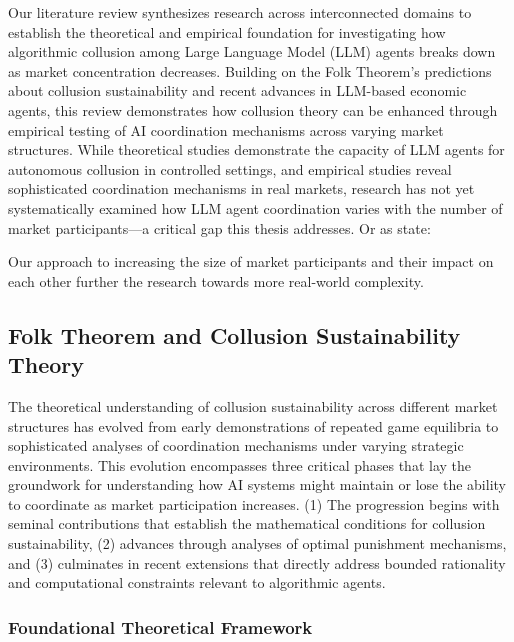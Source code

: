 Our literature review synthesizes research across interconnected domains to establish the theoretical and empirical foundation for investigating how algorithmic collusion among Large Language Model (LLM) agents breaks down as market concentration decreases. Building on the Folk Theorem's predictions about collusion sustainability and recent advances in LLM-based economic agents, this review demonstrates how collusion theory can be enhanced through empirical testing of AI coordination mechanisms across varying market structures. While theoretical studies demonstrate the capacity of LLM agents for autonomous collusion in controlled settings, and empirical studies reveal sophisticated coordination mechanisms in real markets, research has not yet systematically examined how LLM agent coordination varies with the number of market participants---a critical gap this thesis addresses. Or as \textcite[p.24]{fish_algorithmic_2025} state:
\begin{displayquote}
\end{displayquote}

Our approach to increasing the size of market participants and their impact on each other further the research towards more real-world complexity.

\subsection{Folk Theorem and Collusion Sustainability Theory}

The theoretical understanding of collusion sustainability across different market structures has evolved from early demonstrations of repeated game equilibria to sophisticated analyses of coordination mechanisms under varying strategic environments. This evolution encompasses three critical phases that lay the groundwork for understanding how AI systems might maintain or lose the ability to coordinate as market participation increases. (1) The progression begins with seminal contributions that establish the mathematical conditions for collusion sustainability, (2) advances through analyses of optimal punishment mechanisms, and (3) culminates in recent extensions that directly address bounded rationality and computational constraints relevant to algorithmic agents.

\subsubsection*{Foundational Theoretical Framework}

